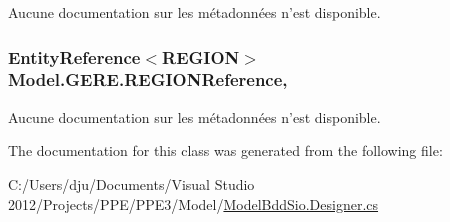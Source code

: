 Aucune documentation sur les métadonnées n'est disponible. 

\hypertarget{class_model_1_1_g_e_r_e_a0f56d7771d836653c33cf5072e586b79}{
\subsubsection[{R\-E\-G\-I\-O\-N\-Reference}]{\setlength{\rightskip}{0pt plus 5cm}Entity\-Reference$<${\bf R\-E\-G\-I\-O\-N}$>$ Model.\-G\-E\-R\-E.\-R\-E\-G\-I\-O\-N\-Reference\hspace{0.3cm}{\ttfamily [get]}, {\ttfamily [set]}}}\label{class_model_1_1_g_e_r_e_a0f56d7771d836653c33cf5072e586b79}


Aucune documentation sur les métadonnées n'est disponible. 



The documentation for this class was generated from the following file\-:\begin{DoxyCompactItemize}
\item 
C\-:/\-Users/dju/\-Documents/\-Visual Studio 2012/\-Projects/\-P\-P\-E/\-P\-P\-E3/\-Model/\hyperlink{_model_bdd_sio_8_designer_8cs}{Model\-Bdd\-Sio.\-Designer.\-cs}\end{DoxyCompactItemize}
